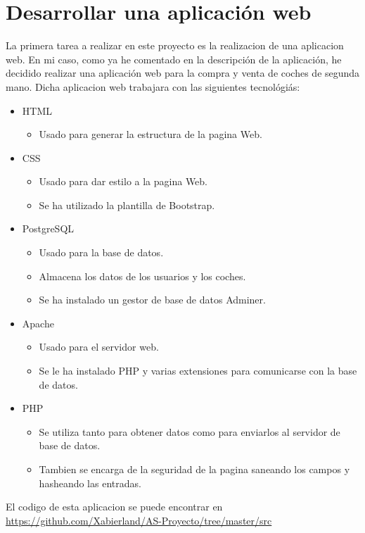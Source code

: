 \documentclass{report}
\begin{document}
        \section{Desarrollar una aplicación web}
            La primera tarea a realizar en este proyecto es la realizacion de una aplicacion web.
            En mi caso, como ya he comentado en la descripción de la aplicación, he decidido realizar una aplicación web para la compra y venta de coches de segunda mano.
            Dicha aplicacion web trabajara con las siguientes tecnológiás:
            \begin{itemize}
                \item HTML
                \begin{itemize}
                    \item Usado para generar la estructura de la pagina Web.
                \end{itemize}
                \item CSS
                \begin{itemize}
                    \item Usado para dar estilo a la pagina Web.
                    \item Se ha utilizado la plantilla de Bootstrap.
                \end{itemize}
                \item PostgreSQL
                \begin{itemize}
                    \item Usado para la base de datos.
                    \item Almacena los datos de los usuarios y los coches.
                    \item Se ha instalado un gestor de base de datos Adminer.
                \end{itemize}
                \item Apache
                \begin{itemize}
                    \item Usado para el servidor web.
                    \item Se le ha instalado PHP y varias extensiones para comunicarse con la base de datos.
                \end{itemize}
                \item PHP
                \begin{itemize}
                    \item Se utiliza tanto para obtener datos como para enviarlos al servidor de base de datos.
                    \item Tambien se encarga de la seguridad de la pagina saneando los campos y hasheando las entradas.
                \end{itemize}
            \end{itemize}
            El codigo de esta aplicacion se puede encontrar en \url{https://github.com/Xabierland/AS-Proyecto/tree/master/src}
        \clearpage
\end{document}
